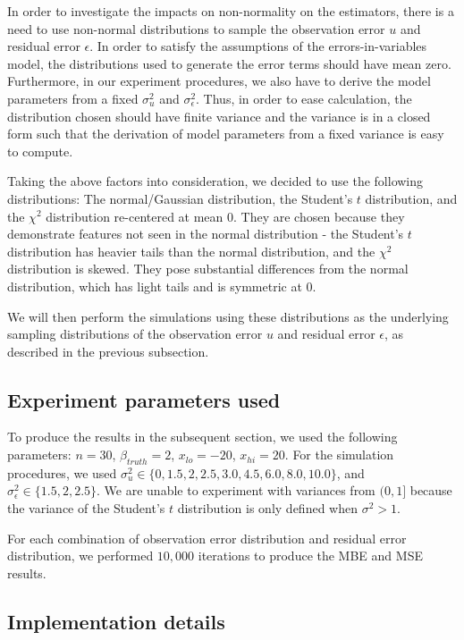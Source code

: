 \documentclass{article}
\begin{document}
In order to investigate the impacts on non-normality on the estimators, there is a need to use non-normal distributions to sample the observation error $u$ and residual error $\epsilon$.
In order to satisfy the assumptions of the errors-in-variables model, the distributions used to generate the error terms should have mean zero.
Furthermore, in our experiment procedures, we also have to derive the model parameters from a fixed $\sigma_u^2$ and $\sigma_\epsilon^2$.
Thus, in order to ease calculation, the distribution chosen should have finite variance and the variance is in a closed form such that the derivation of model parameters from a fixed variance is easy to compute.

Taking the above factors into consideration, we decided to use the following distributions: The normal/Gaussian distribution, the Student's $t$ distribution, and the $\chi^2$ distribution re-centered at mean $0$.
They are chosen because they demonstrate features not seen in the normal distribution - the Student's $t$ distribution has heavier tails than the normal distribution, and the $\chi^2$ distribution is skewed.
They pose substantial differences from the normal distribution, which has light tails and is symmetric at $0$.

We will then perform the simulations using these distributions as the underlying sampling distributions of the observation error $u$ and residual error $\epsilon$, as described in the previous subsection.

\subsection{Experiment parameters used}

To produce the results in the subsequent section, we used the following parameters: $n=30$, $\beta_{truth}=2$, $x_{lo} = -20$, $x_{hi} = 20$.
For the simulation procedures, we used $\sigma^2_u \in \{0, 1.5, 2, 2.5, 3.0, 4.5, 6.0, 8.0, 10.0\}$, and $\sigma_\epsilon^2 \in \{1.5, 2, 2.5\}$.
We are unable to experiment with variances from $(0, 1]$ because the variance of the Student's $t$ distribution is only defined when $\sigma^2 > 1$.

For each combination of observation error distribution and residual error distribution, we performed $10,000$ iterations to produce the MBE and MSE results.

\subsection{Implementation details}
\end{document}
